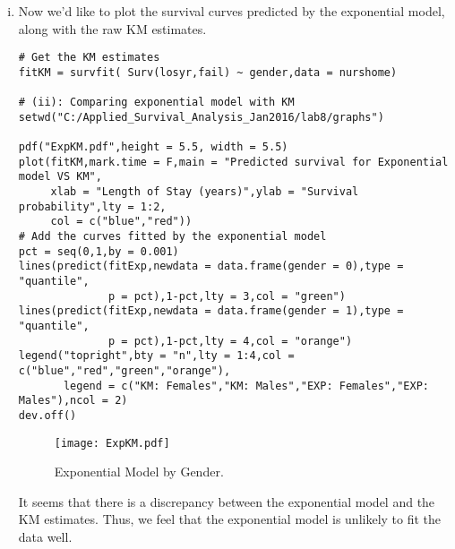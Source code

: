 \begin{enumerate}[(i)]
\begin{spacing}{1.2}
\begin{footnotesize}
\begin{verbatim}
Concordance= 0.541  (se = 0.006 )
Rsquare= 0.024   (max possible= 1 )
Likelihood ratio test= 38.29  on 1 df,   p=6.11e-10
Wald test            = 40.62  on 1 df,   p=1.852e-10
Score (logrank) test = 41.14  on 1 df,   p=1.415e-10
\end{verbatim}
\end{footnotesize}
\end{spacing}
We observe opposite signs between the results from the exponential model and the Cox model. This is expected since we see in the help file of \verb|survreg| that the survreg function uses an accelerated failure-time
parameterization. However, in today's notes we saw that the exponential and Weibull models have both PH and AFT parameterizations. For the exponential case, to transform the coefficients into a PH form, just type the following
\begin{spacing}{1.2}
\begin{footnotesize}
\begin{verbatim}
> # Tranform coefficients into a proportional hazards parameterization
> - coef(fitExp)
(Intercept)      gender 
 0.05775499  0.51618597 
\end{verbatim}
\end{footnotesize}
\end{spacing}
\item Now we'd like to plot the survival curves predicted by the exponential model, along with the raw KM estimates.
\begin{spacing}{1.2}
\begin{footnotesize}
\begin{verbatim}
# Get the KM estimates
fitKM = survfit( Surv(losyr,fail) ~ gender,data = nurshome)

# (ii): Comparing exponential model with KM
setwd("C:/Applied_Survival_Analysis_Jan2016/lab8/graphs")

pdf("ExpKM.pdf",height = 5.5, width = 5.5)
plot(fitKM,mark.time = F,main = "Predicted survival for Exponential model VS KM",
     xlab = "Length of Stay (years)",ylab = "Survival probability",lty = 1:2,
     col = c("blue","red"))
# Add the curves fitted by the exponential model
pct = seq(0,1,by = 0.001)
lines(predict(fitExp,newdata = data.frame(gender = 0),type = "quantile",
              p = pct),1-pct,lty = 3,col = "green")
lines(predict(fitExp,newdata = data.frame(gender = 1),type = "quantile",
              p = pct),1-pct,lty = 4,col = "orange")
legend("topright",bty = "n",lty = 1:4,col = c("blue","red","green","orange"),
       legend = c("KM: Females","KM: Males","EXP: Females","EXP: Males"),ncol = 2)
dev.off()
\end{verbatim}
\end{footnotesize}
\end{spacing}
\begin{figure}[htbp]
	\centering
		\texttt{[image: ExpKM.pdf]}
	\caption{Exponential Model by Gender.}
	\label{figure1}
\end{figure}
It seems that there is a discrepancy between the exponential model and the KM estimates. Thus, we feel that the exponential model is unlikely to fit the data well. 


\end{enumerate}

